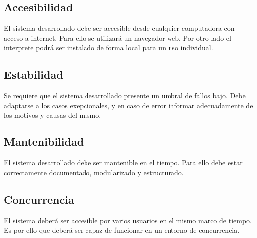 \subsection{Accesibilidad}
El sistema desarrollado debe ser accesible desde cualquier computadora con acceso a internet. Para ello se utilizará un navegador web. Por otro lado 
el interprete podrá ser instalado de forma local para un uso individual.

\subsection{Estabilidad}
Se requiere que el sistema desarrollado presente un umbral de fallos bajo. Debe adaptarse a los casos exepcionales, y en caso de error informar adecuadamente de
los motivos y causas del mismo.

\subsection{Mantenibilidad}
El sistema desarrollado debe ser mantenible en el tiempo. Para ello debe estar correctamente documentado, modularizado y estructurado. 

\subsection{Concurrencia}
El sistema deberá ser accesible por varios usuarios en el mismo marco de tiempo. Es por ello que deberá ser capaz de funcionar en un entorno de 
concurrencia.




